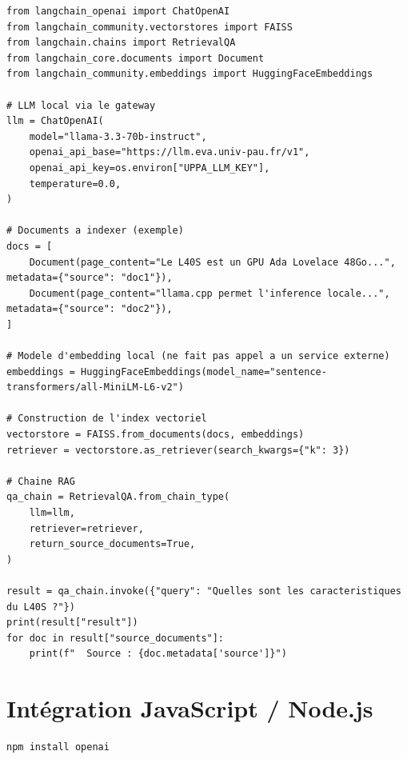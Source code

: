 \documentclass[12pt, a4paper, twoside]{article}
\begin{document}
\begin{lstlisting}[style=pythonstyle, caption={Pipeline RAG complet avec LangChain, FAISS et embeddings locaux}]
from langchain_openai import ChatOpenAI
from langchain_community.vectorstores import FAISS
from langchain.chains import RetrievalQA
from langchain_core.documents import Document
from langchain_community.embeddings import HuggingFaceEmbeddings

# LLM local via le gateway
llm = ChatOpenAI(
    model="llama-3.3-70b-instruct",
    openai_api_base="https://llm.eva.univ-pau.fr/v1",
    openai_api_key=os.environ["UPPA_LLM_KEY"],
    temperature=0.0,
)

# Documents a indexer (exemple)
docs = [
    Document(page_content="Le L40S est un GPU Ada Lovelace 48Go...", metadata={"source": "doc1"}),
    Document(page_content="llama.cpp permet l'inference locale...",   metadata={"source": "doc2"}),
]

# Modele d'embedding local (ne fait pas appel a un service externe)
embeddings = HuggingFaceEmbeddings(model_name="sentence-transformers/all-MiniLM-L6-v2")

# Construction de l'index vectoriel
vectorstore = FAISS.from_documents(docs, embeddings)
retriever = vectorstore.as_retriever(search_kwargs={"k": 3})

# Chaine RAG
qa_chain = RetrievalQA.from_chain_type(
    llm=llm,
    retriever=retriever,
    return_source_documents=True,
)

result = qa_chain.invoke({"query": "Quelles sont les caracteristiques du L40S ?"})
print(result["result"])
for doc in result["source_documents"]:
    print(f"  Source : {doc.metadata['source']}")
\end{lstlisting}

\section{Intégration JavaScript / Node.js}
\label{sec:nodejs}

\begin{lstlisting}[style=bashstyle]
npm install openai
\end{lstlisting}
\end{document}
